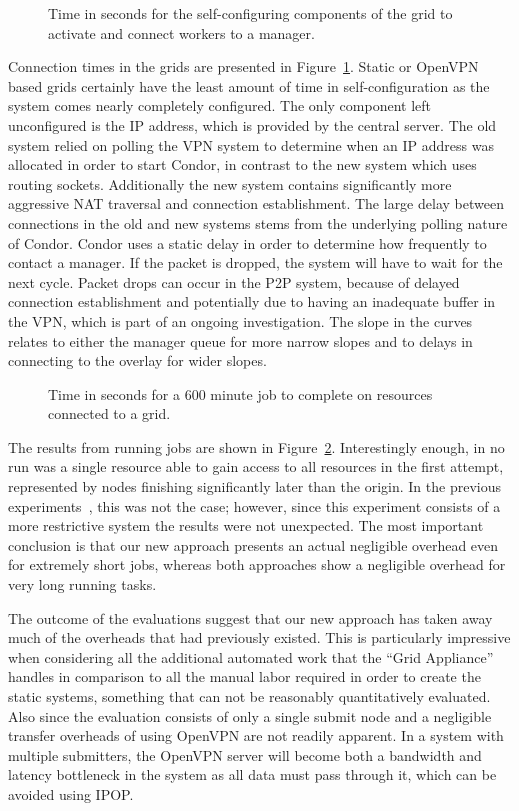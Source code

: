 \documentclass[twocolumn]{svjour3}
\begin{document}
\begin{figure}[ht]
\centering
{}
\caption{Time in seconds for the self-configuring components of the grid to
activate and connect workers to a manager.}
\label{fig:connect}
\end{figure}

Connection times in the grids are presented in Figure~\ref{fig:connect}.
Static or OpenVPN based grids certainly have the least amount of time in
self-configuration as the system comes nearly completely configured.  The only
component left unconfigured is the IP address, which is provided by the central
server.  The old system relied on polling the VPN system to determine when an
IP address was allocated in order to start Condor, in contrast to the new
system which uses routing sockets.  Additionally the new system contains
significantly more aggressive NAT traversal and connection establishment.  The
large delay between connections in the old and new systems stems from the
underlying polling nature of Condor.  Condor uses a static delay in order to
determine how frequently to contact a manager.  If the packet is dropped, the
system will have to wait for the next cycle.  Packet drops can occur in the P2P
system, because of delayed connection establishment and potentially due to
having an inadequate buffer in the VPN, which is part of an ongoing
investigation.  The slope in the curves relates to either the manager queue for
more narrow slopes and to delays in connecting to the overlay for wider slopes.

\begin{figure}[ht]
\centering
{}
\caption{Time in seconds for a 600 minute job to complete on resources
connected to a grid.}
\label{fig:run}
\end{figure}

The results from running jobs are shown in Figure~\ref{fig:run}.  Interestingly
enough, in no run was a single resource able to gain access to all resources in
the first attempt, represented by nodes finishing significantly later than the
origin.  In the previous experiments~\cite{hpdc11}, this was not the case;
however, since this experiment consists of a more restrictive system the
results were not unexpected.   The most important conclusion is that our new
approach presents an actual negligible overhead even for extremely short jobs,
whereas both approaches show a negligible overhead for very long running tasks.

The outcome of the evaluations suggest that our new approach has taken away
much of the overheads that had previously existed.  This is particularly
impressive when considering all the additional automated work that the ``Grid
Appliance'' handles in comparison to all the manual labor required in order to
create the static systems, something that can not be reasonably quantitatively
evaluated.  Also since the evaluation consists of only a single submit node and
a negligible transfer overheads of using OpenVPN are not readily apparent.  In
a system with multiple submitters, the OpenVPN server will become both a
bandwidth and latency bottleneck in the system as all data must pass through
it, which can be avoided using IPOP.
\end{document}
